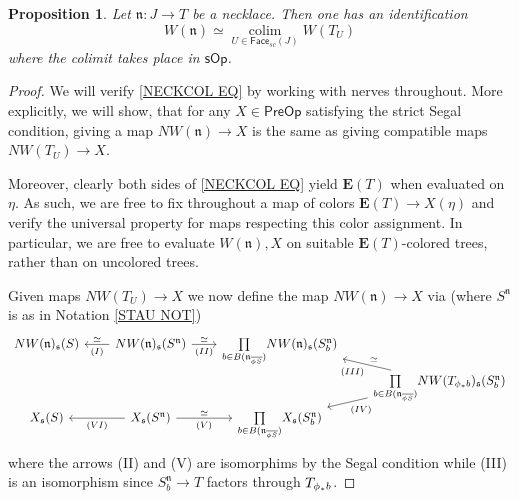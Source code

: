 \documentclass[a4paper,10pt
,draft
]{article}%
\numberwithin{equation}{section}
\numberwithin{figure}{section}
\newtheorem{proposition}[equation]{Proposition}%
\theoremstyle{definition} %
\DeclareMathOperator{\colim}{colim}%
\newcommand{\1}{\ensuremath{\mathbbm 1}}%
\begin{document}
\begin{proposition}\label{NECKCOL PROP}
	Let $\mathfrak{n} \colon J \to T$ be a necklace.
	Then one has an identification
\begin{equation}\label{NECKCOL EQ}
	W(\mathfrak{n})
	\simeq 
	\underset{U \in \mathsf{Face}_{sc}(J)}{\colim}
	W(T_U)
\end{equation}
	where the colimit takes place 
	in $\mathsf{sOp}$.
\end{proposition}



\begin{proof}
	We will verify \eqref{NECKCOL EQ}
	by working with nerves throughout.
	More explicitly, 
	we will show, that for any $X\in \mathsf{PreOp}$
	satisfying the strict Segal condition,
	giving a map
	$NW(\mathfrak{n}) \to X$
	is the same as giving compatible maps
	$NW(T_U) \to X$.

	Moreover, clearly both sides of 
	\eqref{NECKCOL EQ} yield $\boldsymbol{E}(T)$
	when evaluated on $\eta$.
	As such, we are free to fix throughout
	a map of colors $\boldsymbol{E}(T) \to X(\eta)$
	and verify the universal property 
	for maps respecting this color assignment.
	In particular, we are free to 
	evaluate $W(\mathfrak{n}),X$ on suitable 
	$\boldsymbol{E}(T)$-colored trees, 
	rather than on uncolored trees.

	Given maps $NW(T_U) \to X$
	we now define the map $NW(\mathfrak{n}) \to X$ via 
	(where $S^{\mathfrak{n}}$ is as in Notation \ref{STAU NOT})
\begin{equation}\label{LONGMAP EQ}
\begin{tikzcd}[column sep = 20pt, row sep=0]
	NW(\mathfrak{n})_{\mathfrak{s}}(S)
&
	NW(\mathfrak{n})_{\mathfrak{s}}(S^{\mathfrak{n}})
	\ar{l}[swap]{\simeq}{(I)}
	\ar{r}{\simeq}[swap]{(II)}
&
	\underset{b \in B( \mathfrak{n}_{\overline{\phi S}})}{\prod}
	NW(\mathfrak{n})_{\mathfrak{s}}(S^{\mathfrak{n}}_b)
\\
&&&
	\underset{b \in B( \mathfrak{n}_{\overline{\phi S}})}{\prod}
	NW(T_{\phi_{\**}b})_{\mathfrak{s}}(S^{\mathfrak{n}}_b)
	\ar{lu}[swap]{\simeq}{(III)}
	\ar{ld}{(IV)}
\\
	X_{\mathfrak{s}}(S)
&
	X_{\mathfrak{s}}(S^{\mathfrak{n}})
	\ar{r}{\simeq}[swap]{(V)}
	\ar{l}{(VI)}
&
	\underset{b \in B(\mathfrak{n}_{\overline{\phi S}})}{\prod}
	X_{\mathfrak{s}}(S^{\mathfrak{n}}_b)
\end{tikzcd}
\end{equation}
	where the arrows (II) and (V) are isomorphims by the Segal condition
	while (III) is an isomorphism since 
	$S_b^{\mathfrak{n}} \to T$ factors through 
	$T_{\phi_{\**}b}$.
	

\end{proof}
\end{document}

